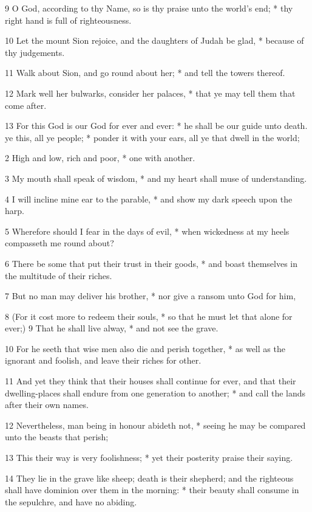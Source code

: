 9 O God, according to thy Name, so is thy praise unto the world's end; * thy right hand is full of righteousness.\par
10 Let the mount Sion rejoice, and the daughters of Judah be glad, * because of thy judgements.\par
11 Walk about Sion, and go round about her; * and tell the towers thereof.\par
12 Mark well her bulwarks, consider her palaces, * that ye may tell them that come after.\par
13 For this God is our God for ever and ever: * he shall be our guide unto death.
 ye this, all ye people; * ponder it with your ears, all ye that dwell in the world;\par
2 High and low, rich and poor, * one with another.\par
3 My mouth shall speak of wisdom, * and my heart shall muse of understanding.\par
4 I will incline mine ear to the parable, * and show my dark speech upon the harp.\par
5 Wherefore should I fear in the days of evil, * when wickedness at my heels compasseth me round about?\par
6 There be some that put their trust in their goods, * and boast themselves in the multitude of their riches.\par
7 But no man may deliver his brother, * nor give a ransom unto God for him,\par
8 (For it cost more to redeem their souls, * so that he must let that alone for ever;)
9 That he shall live alway, * and not see the grave.\par
10 For he seeth that wise men also die and perish together, * as well as the ignorant and foolish, and leave their riches for other.\par
11 And yet they think that their houses shall continue for ever, and that their dwelling-places shall endure from one generation to another; * and call the lands after their own names.\par
12 Nevertheless, man being in honour abideth not, * seeing he may be compared unto the beasts that perish;\par
13 This their way is very foolishness; * yet their posterity praise their saying.\par
14 They lie in the grave like sheep; death is their shepherd; and the righteous shall have dominion over them in the morning: * their beauty shall consume in the sepulchre, and have no abiding.\par
